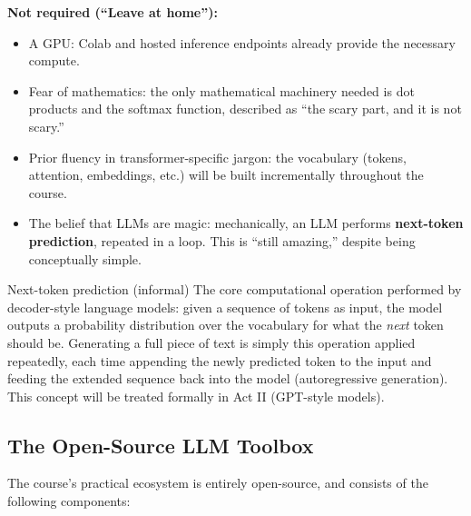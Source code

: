 \textbf{Not required (``Leave at home''):}
\begin{itemize}
    \item A GPU: Colab and hosted inference endpoints already provide the necessary compute.
    \item Fear of mathematics: the only mathematical machinery needed is dot products and the softmax function, described as ``the scary part, and it is not scary.''
    \item Prior fluency in transformer-specific jargon: the vocabulary (tokens, attention, embeddings, etc.) will be built incrementally throughout the course.
    \item The belief that LLMs are magic: mechanically, an LLM performs \textbf{next-token prediction}, repeated in a loop. This is ``still amazing,'' despite being conceptually simple.
\end{itemize}

\begin{defbox}{Next-token prediction (informal)}
The core computational operation performed by decoder-style language models: given a sequence of tokens as input, the model outputs a probability distribution over the vocabulary for what the \emph{next} token should be. Generating a full piece of text is simply this operation applied repeatedly, each time appending the newly predicted token to the input and feeding the extended sequence back into the model (autoregressive generation). This concept will be treated formally in Act II (GPT-style models).
\end{defbox}

\subsection{The Open-Source LLM Toolbox }

The course's practical ecosystem is entirely open-source, and consists of the following components:

